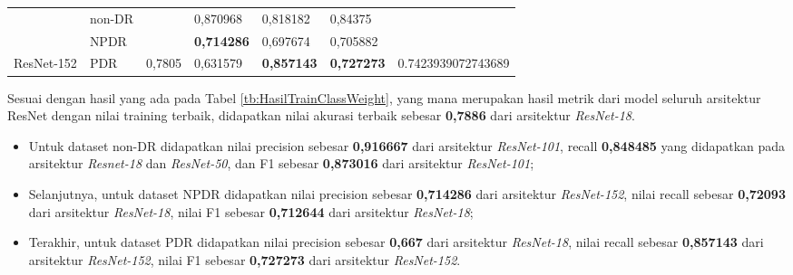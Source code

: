 \begin{table}[hbtp]
\begin{center}
\begin{tabular}{|c|l|c|l|l|l|c|}
			& non-DR                                             &                          & 0,870968                                          & 0,818182                                         & 0,84375                                         &                                      \\ \cline{2-2} \cline{4-6}
			& NPDR                                               &                          & \textbf{0,714286}                                 & 0,697674                                         & 0,705882                                        &                                      \\ \cline{2-2} \cline{4-6}
			\multirow{-3}{*}{ResNet-152} & PDR                                                & \multirow{-3}{*}{0,7805} & 0,631579                                          & \textbf{0,857143}                                & \textbf{0,727273}                               & \multirow{-3}{*}{0.7423939072743689} \\ \hline
		\end{tabular}
	\end{center}
\end{table}

Sesuai dengan hasil yang ada pada Tabel \ref{tb:HasilTrainClassWeight}, yang mana merupakan hasil metrik dari model seluruh arsitektur ResNet dengan nilai training terbaik, didapatkan nilai akurasi terbaik sebesar \textbf{0,7886} dari arsitektur \emph{ResNet-18}.

\begin{itemize}
	
	\item Untuk dataset non-DR didapatkan nilai precision sebesar \textbf{0,916667} dari arsitektur \emph{ResNet-101}, recall \textbf{0,848485} yang didapatkan pada arsitektur \emph{Resnet-18} dan \emph{ResNet-50}, dan F1 sebesar \textbf{0,873016} dari arsitektur \emph{ResNet-101};
	
	\item Selanjutnya, untuk dataset NPDR didapatkan nilai precision sebesar \textbf{0,714286} dari arsitektur \emph{ResNet-152}, nilai recall sebesar \textbf{0,72093} dari arsitektur \emph{ResNet-18}, nilai F1 sebesar \textbf{0,712644} dari arsitektur \emph{ResNet-18};
	
	\item Terakhir, untuk dataset PDR didapatkan nilai precision sebesar \textbf{0,667} dari arsitektur \emph{ResNet-18}, nilai recall sebesar \textbf{0,857143} dari arsitektur \emph{ResNet-152}, nilai F1 sebesar \textbf{0,727273} dari arsitektur \emph{ResNet-152}.
	
\end{itemize}

